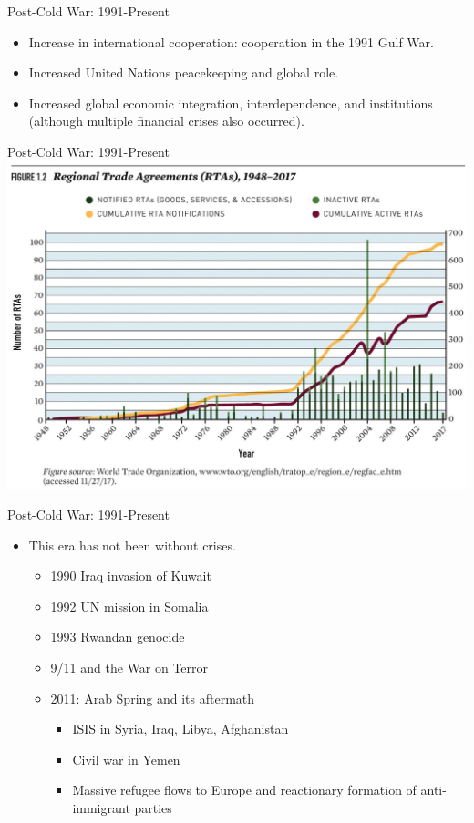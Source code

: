 \documentclass[handout]{beamer}
\begin{document}
\begin{frame}{\LARGE Post-Cold War: 1991-Present}
	\begin{itemize}
		\item Increase in international cooperation: cooperation in the 1991 Gulf War.
		\item Increased United Nations peacekeeping and global role.
		\item Increased global economic integration, interdependence, and institutions (although multiple financial crises also occurred).
	\end{itemize}
\end{frame}

\begin{frame}{\LARGE Post-Cold War: 1991-Present}
\centering
\includegraphics[width=\textwidth,height=.9\textheight,keepaspectratio]{RTAs.jpg}
\end{frame}

\begin{frame}{\LARGE Post-Cold War: 1991-Present}
	\begin{itemize}
		\item This era has not been without crises.
		\begin{itemize}
			\item 1990 Iraq invasion of Kuwait
			\item 1992 UN mission in Somalia 
			\item 1993 Rwandan genocide
			\item 9/11 and the War on Terror
			\item 2011: Arab Spring and its aftermath
			\begin{itemize}
				\item ISIS in Syria, Iraq, Libya, Afghanistan
				\item Civil war in Yemen
				\item Massive refugee flows to Europe and reactionary formation of anti-immigrant parties
			\end{itemize}	
		\end{itemize}
	\end{itemize}
\end{frame}
\end{document}
